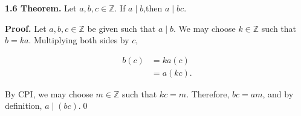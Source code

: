 \documentclass[12pt]{article}
\begin{document}
\noindent\textbf{1.6 Theorem.} Let $a,b,c\in\mathbb{Z}$. If $a\mid b$,then $a\mid bc$.

\bigskip

\noindent\textbf{Proof.} Let $a,b,c\in\mathbb{Z}$ be given such that $a\mid b$. We may choose $k\in\mathbb{Z}$ such that $b=ka$. Multiplying both sides by $c$,


\begin{align*}
b(c) &= ka(c) \\
&= a(kc).
\end{align*}


\noindent By CPI, we may choose $m\in\mathbb{Z}$ such that $kc=m$. Therefore, $bc=am$, and by definition, $a\mid(bc)$.\qed
\end{document}
